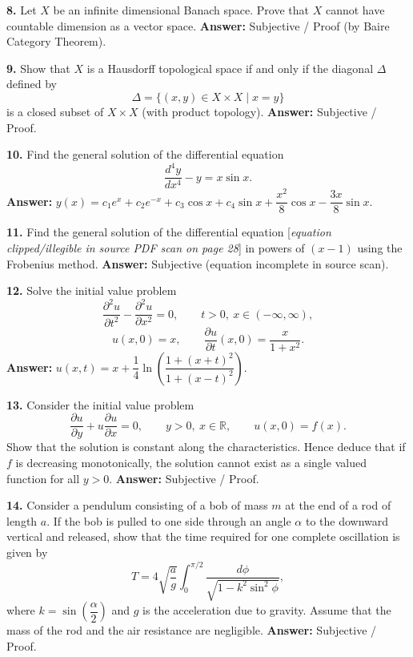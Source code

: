 \documentclass[11pt,a4paper]{article}
\newcommand{\ans}[1]{\textbf{Answer:} #1\par\medskip}
\begin{document}
\textbf{8.} Let $X$ be an infinite dimensional Banach space. Prove that $X$ cannot have countable dimension as a vector space.
\ans{Subjective / Proof (by Baire Category Theorem).}

\textbf{9.} Show that $X$ is a Hausdorff topological space if and only if the diagonal $\Delta$ defined by
\[
  \Delta = \{(x, y) \in X \times X \mid x = y\}
\]
is a closed subset of $X \times X$ (with product topology).
\ans{Subjective / Proof.}

\textbf{10.} Find the general solution of the differential equation
\[
  \frac{d^4y}{dx^4} - y = x\sin x.
\]
\ans{$y(x) = c_1 e^x + c_2 e^{-x} + c_3\cos x + c_4\sin x + \dfrac{x^2}{8}\cos x - \dfrac{3x}{8}\sin x$.}

\textbf{11.} Find the general solution of the differential equation [\textit{equation clipped/illegible in source PDF scan on page 28}] in powers of $(x - 1)$ using the Frobenius method.
\ans{Subjective (equation incomplete in source scan).}

\textbf{12.} Solve the initial value problem
\[
  \frac{\partial^2 u}{\partial t^2} - \frac{\partial^2 u}{\partial x^2} = 0, \qquad t > 0,\ x \in (-\infty, \infty),
\]
\[
  u(x, 0) = x, \qquad \frac{\partial u}{\partial t}(x, 0) = \frac{x}{1 + x^2}.
\]
\ans{$u(x, t) = x + \dfrac{1}{4}\ln\!\left(\dfrac{1 + (x + t)^2}{1 + (x - t)^2}\right)$.}

\textbf{13.} Consider the initial value problem
\[
  \frac{\partial u}{\partial y} + u\frac{\partial u}{\partial x} = 0, \qquad y > 0,\ x \in \mathbb{R}, \qquad u(x, 0) = f(x).
\]
Show that the solution is constant along the characteristics. Hence deduce that if $f$ is decreasing monotonically, the solution cannot exist as a single valued function for all $y > 0$.
\ans{Subjective / Proof.}

\textbf{14.} Consider a pendulum consisting of a bob of mass $m$ at the end of a rod of length $a$. If the bob is pulled to one side through an angle $\alpha$ to the downward vertical and released, show that the time required for one complete oscillation is given by
\[
  T = 4\sqrt{\frac{a}{g}}\int_0^{\pi/2} \frac{d\phi}{\sqrt{1 - k^2\sin^2\phi}},
\]
where $k = \sin\!\left(\dfrac{\alpha}{2}\right)$ and $g$ is the acceleration due to gravity. Assume that the mass of the rod and the air resistance are negligible.
\ans{Subjective / Proof.}
\end{document}
